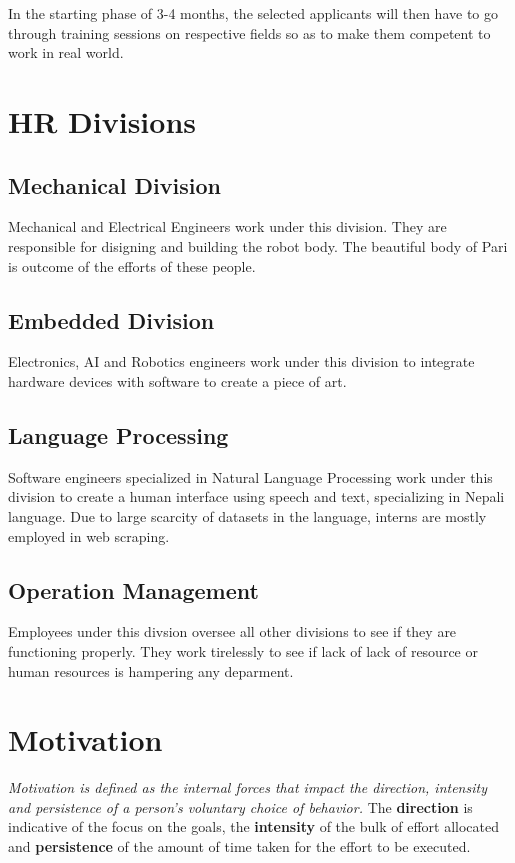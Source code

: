 \documentclass[12pt,a4paper]{scrreprt}
\begin{document}
In the starting phase of 3-4 months, the selected applicants will then have to go through
training sessions on respective fields so as to make them competent to work in real world.
\section{HR Divisions}
\subsection{Mechanical Division}
Mechanical and Electrical Engineers work under this division. They are responsible for disigning and building the robot body. The beautiful body of Pari is outcome of the efforts of these people.

\subsection{Embedded Division}
Electronics, AI and Robotics engineers work under this division to integrate hardware devices with software to create a piece of art.

\subsection{Language Processing}
Software engineers specialized in Natural Language Processing work under this division to create a human interface using speech and text, specializing in Nepali language. Due to large scarcity of datasets in the language, interns are mostly employed in web scraping.

\subsection{Operation Management}
Employees under this divsion oversee all other divisions to see if they are functioning properly. They work tirelessly to see if lack of lack of resource or human resources is hampering any deparment.

\section{Motivation}
\textit{Motivation is defined as the internal forces that impact the direction, intensity and persistence of a person’s voluntary choice of behavior.} The \textbf{direction} is indicative of the focus on the goals, the \textbf{intensity} of the bulk of effort allocated and \textbf{persistence} of the amount of time taken for the effort to be executed.
\end{document}
